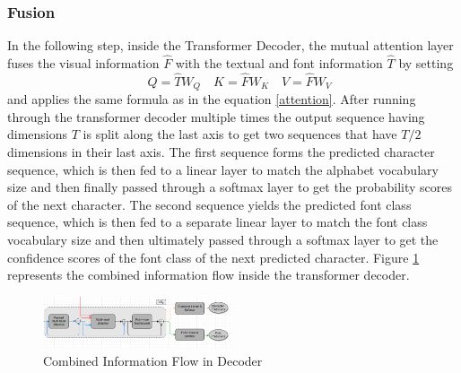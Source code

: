 \documentclass[conference]{IEEEtran}
\begin{document}
\subsubsection{Fusion}\label{Fusion}
In the following step, inside the Transformer Decoder, the mutual attention layer fuses the visual information \(\hat{F}\) with the textual and font information \(\hat{T}\) by setting 
\begin{equation}\label{second_attention_mechanism}
\quad Q = \hat{T}W_Q \quad K = \hat{F}W_K \quad V = \hat{F}W_V \tag{9}
\end{equation}
and applies the same formula as in the equation \ref{attention}. After running through the transformer decoder multiple times the output sequence having dimensions \(T\) is split along the last axis to get two sequences that have \(T/2\) dimensions in their last axis. The first sequence forms the predicted character sequence, which is then fed to a linear layer to match the alphabet vocabulary size and then finally passed through a softmax layer to get the probability scores of the next character. The second sequence yields the predicted font class sequence, which is then fed to a separate linear layer to match the font class vocabulary size and then ultimately passed through a softmax layer to get the confidence scores of the font class of the next predicted character. Figure \ref{decoder} represents the combined information flow inside the transformer decoder.
\begin{figure}[htbp]
    \centering
    \includegraphics[width=0.5\textwidth]{figures/Decoder.png}
    \caption{Combined Information Flow in Decoder}
    \label{decoder}
\end{figure}
\newpage
\end{document}
